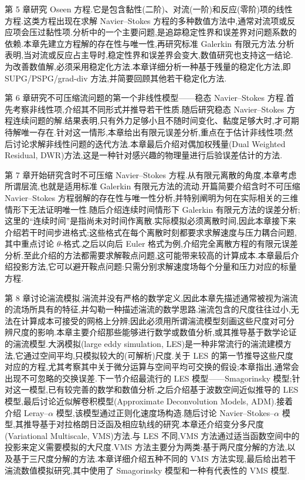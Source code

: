 第 5 章研究 Oseen 方程.它是包含黏性(二阶)、对流(一阶)和反应(零阶)项的线性方程.这类方程出现在求解 Navier--Stokes 方程的多种数值方法中,通常对流项或反应项会压过黏性项.分析中的一个主要问题,是追踪稳定性界和误差界对问题系数的依赖.本章先建立方程解的存在性与唯一性,再研究标准 Galerkin 有限元方法.分析表明,当对流或反应占主导时,稳定性界和误差界会变大,数值研究也支持这一结论.为改善数值解,必须采用稳定化方法.本章详细分析一种基于残量的稳定化方法,即 SUPG/PSPG/grad-div 方法,并简要回顾其他若干稳定化方法.

第 6 章研究不可压缩流问题的第一个非线性模型——稳态 Navier--Stokes 方程.首先考察非线性项,介绍其不同形式并推导若干性质.随后研究稳态 Navier--Stokes 方程连续问题的解.结果表明,只有外力足够小且不随时间变化、黏度足够大时,才可期待解唯一存在.针对这一情形,本章给出有限元误差分析,重点在于估计非线性项;然后讨论求解非线性问题的迭代方法.本章最后介绍对偶加权残量(Dual Weighted Residual, DWR)方法,这是一种针对感兴趣的物理量进行后验误差估计的方法.

第 7 章开始研究含时不可压缩 Navier--Stokes 方程.从有限元离散的角度,本章考虑所谓层流,也就是适用标准 Galerkin 有限元方法的流动.开篇简要介绍含时不可压缩 Navier--Stokes 方程弱解的存在性与唯一性分析,并特别阐明为何在实际相关的三维情形下无法证明唯一性.随后介绍连续时间情形下 Galerkin 有限元方法的误差分析;这里的“连续时间”是指尚未对时间作离散.实际模拟必须离散时间,因此本章接下来介绍若干时间步进格式;这些格式在每个离散时刻都要求求解速度与压力耦合问题,其中重点讨论 \(\theta\)-格式.之后以向后 Euler 格式为例,介绍完全离散方程的有限元误差分析.至此介绍的方法都需要求解鞍点问题,这可能带来较高的计算成本.本章最后介绍投影方法,它可以避开鞍点问题:只需分别求解速度场每个分量和压力对应的标量方程.

第 8 章讨论湍流模拟.湍流并没有严格的数学定义,因此本章先描述通常被视为湍流的流场所具有的特征,并勾勒一种描述湍流的数学思路.湍流包含的尺度往往过小,无法在计算成本可接受的网格上分辨;因此必须用所谓湍流模型刻画这些尺度对可分辨尺度的影响.本章主要介绍那些能够进行数学或数值分析,或其推导基于数学论证的湍流模型.大涡模拟(large eddy simulation, LES)是一种非常流行的湍流建模方法,它通过空间平均,只模拟较大的(可解析)尺度.关于 LES 的第一节推导这些尺度对应的方程,尤其考察其中关于微分运算与空间平均可交换的假设;本章指出,通常会出现不可忽略的交换误差.下一节介绍最流行的 LES 模型——Smagorinsky 模型;针对这一模型,已有较完善的数学和数值分析.之后介绍基于波数空间近似推导的 LES 模型,最后讨论近似解卷积模型(Approximate Deconvolution Models, ADM).接着介绍 Leray--\(\alpha\) 模型,该模型通过正则化速度场构造.随后讨论 Navier--Stokes--\(\alpha\) 模型,其推导基于对拉格朗日泛函及相应轨线的研究.本章还介绍变分多尺度(Variational Multiscale, VMS)方法.与 LES 不同,VMS 方法通过适当函数空间中的投影来定义需要模拟的大尺度.VMS 方法主要分为两类:基于两尺度分解的方法,以及基于三尺度分解的方法.本章详细介绍五种不同的 VMS 方法实现,最后给出若干湍流数值模拟研究,其中使用了 Smagorinsky 模型和一种有代表性的 VMS 模型.

